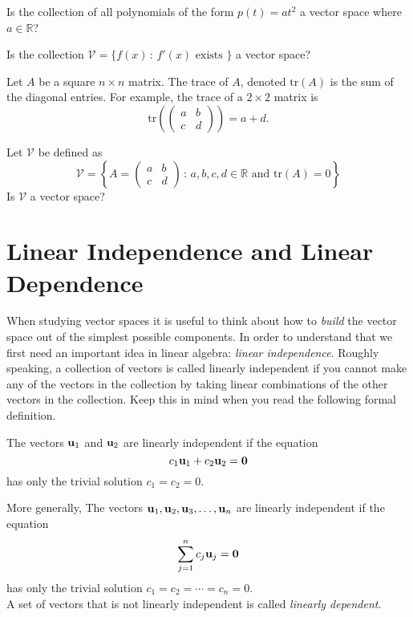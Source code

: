 \begin{problem}
   Is the collection of all polynomials of the form $p(t) = at^2$ a vector space where $a
   \in \mathbb{R}$?
\end{problem}


\begin{problem}
    Is the collection $\mathcal{V} = \{ f(x) \, : \, f'(x) \text{ exists }\}$ a vector
    space?
\end{problem}


\begin{definition}
    Let $A$ be a square $n \times n$ matrix.  The trace of $A$, denoted $\text{tr}(A)$ is
    the sum of the diagonal entries.  For example, the trace of a $2 \times 2$ matrix is
    \[ \text{tr} \left( \begin{pmatrix} a & b \\ c & d \end{pmatrix} \right) = a + d. \]
\end{definition}

\begin{problem}
    Let $\mathcal{V}$ be defined as
    \[ \mathcal{V} = \left\{ A = \begin{pmatrix} a & b \\ c & d \end{pmatrix} \, : \,
    a,b,c,d \in \mathbb{R} \text{ and } \text{tr}(A) = 0 \right\} \]
    Is $\mathcal{V}$ a vector space?
\end{problem}


\newpage\section{Linear Independence and Linear Dependence}
When studying vector spaces it is useful to think about how to {\it build} the vector
space out of the simplest possible components.  In order to understand that we first need
an important idea in linear algebra: {\it linear independence}.  Roughly
speaking, a collection of vectors
is called linearly independent if you cannot make any of the vectors in the collection by
taking linear combinations of the other vectors in the collection.  Keep this in mind when
you read the following formal definition.

\begin{definition}
    The vectors ${\bf u}_1$ and ${\bf u}_2$ are linearly independent if the equation 
    \[ c_1 {\bf u}_1 + c_2 {\bf u}_2 = {\bf 0} \]
    has only the trivial solution $c_1 = c_2 = 0$.

    More generally,
    The vectors ${\bf u}_1, {\bf u}_2, {\bf u}_3, \ldots, {\bf u}_n$ are linearly independent if the equation 
    \[ \sum_{j=1}^n c_j {\bf u}_j  = {\bf 0} \]
    has only the trivial solution $c_1 = c_2 = \cdots = c_n = 0$.\\
    A set of vectors that is not linearly independent is called {\it linearly dependent}.
\end{definition}

